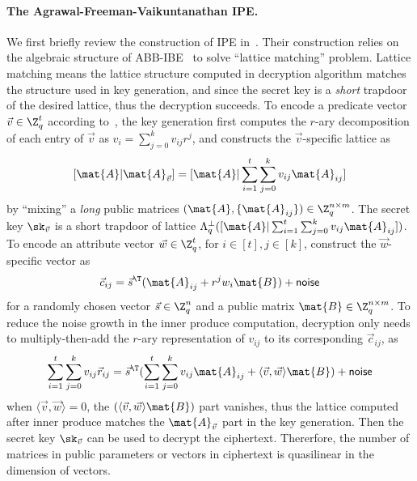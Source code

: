 \paragraph{The Agrawal-Freeman-Vaikuntanathan IPE.}We first briefly review the construction of IPE in~\cite{AC:AgrFreVai11}. Their construction relies on the algebraic structure of ABB-IBE~\cite{EC:AgrBonBoy10} to solve ``lattice matching'' problem. Lattice matching means the lattice structure computed in decryption algorithm matches the structure used in key generation, and since the secret key is a \emph{short} trapdoor of the desired lattice, thus the decryption succeeds. To encode a predicate vector $\vec{v} \in \Z_q^t$ according to~\cite{AC:AgrFreVai11}, the key generation first computes the $r$-ary decomposition of each entry of $\vec{v}$ as $v_i = \sum_{j = 0}^k v_{ij} r^j$, and constructs the $\vec{v}$-specific lattice as
$$[\mat{A} | \mat{A}_{\vec{v}}] = [\mat{A} | \sum_{i = 1}^t \sum_{j = 0}^k v_{ij} \mat{A}_{ij}]$$
by ``mixing'' a \emph{long} public matrices $(\mat{A}, \{\mat{A}_{ij}\}) \in \Z_q^{n \times m}$. The secret key $\sk_{\vec{v}}$ is a short trapdoor of lattice $\Lambda_q^{\bot}([\mat{A} | \sum_{i = 1}^t \sum_{j = 0}^k v_{ij} \mat{A}_{ij}])$. To encode an attribute vector $\vec{w} \in \Z_q^{t}$, for $i \in [t], j \in [k]$, construct the $\vec{w}$-specific vector as
$$\vec{c}_{ij} = \vec{s}^\T ( \mat{A}_{ij} + r^j w_i \mat{B}) + \mathsf{noise}$$
for a randomly chosen vector $\vec{s} \in \Z_q^n$ and a public matrix $\mat{B} \in \Z_q^{n \times m}$. To reduce the noise growth in the inner produce computation, decryption only needs to multiply-then-add the $r$-ary representation of $v_{ij}$ to its corresponding $\vec{c}_{ij}$, as
$$\sum_{i = 1}^t \sum_{j = 0}^k v_{ij}\vec{r}_{ij} = \vec{s}^\T (\sum_{i = 1}^t \sum_{j = 0}^k v_{ij} \mat{A}_{ij} + \langle\vec{v}, \vec{w}\rangle \mat{B}) + \mathsf{noise}$$
when $\langle\vec{v}, \vec{w}\rangle = 0$, the $(\langle\vec{v}, \vec{w}\rangle \mat{B})$ part vanishes, thus the lattice computed after inner produce matches the $\mat{A}_{\vec{v}}$ part in the key generation. Then the secret key $\sk_{\vec{v}}$ can be used to decrypt the ciphertext. Thererfore, the number of matrices in public parameters or vectors in ciphertext is quasilinear in the dimension of vectors.

